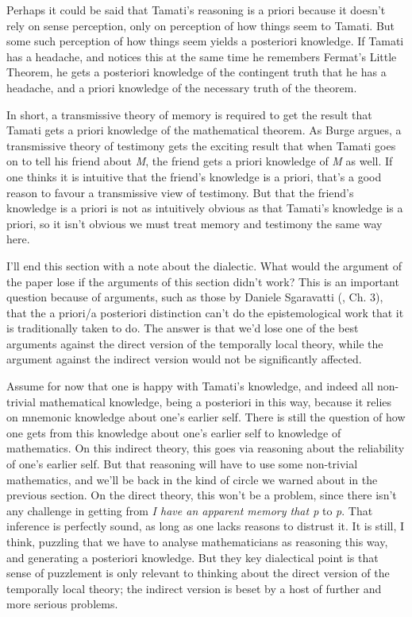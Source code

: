 \documentclass[
  11pt,
  letterpaper,
  DIV=11,
  numbers=noendperiod,
  twoside]{scrartcl}
\begin{document}
Perhaps it could be said that Tamati's reasoning is a priori because it
doesn't rely on sense perception, only on perception of how things seem
to Tamati. But some such perception of how things seem yields a
posteriori knowledge. If Tamati has a headache, and notices this at the
same time he remembers Fermat's Little Theorem, he gets a posteriori
knowledge of the contingent truth that he has a headache, and a priori
knowledge of the necessary truth of the theorem.

In short, a transmissive theory of memory is required to get the result
that Tamati gets a priori knowledge of the mathematical theorem. As
Burge argues, a transmissive theory of testimony gets the exciting
result that when Tamati goes on to tell his friend about \emph{M}, the
friend gets a priori knowledge of \emph{M} as well. If one thinks it is
intuitive that the friend's knowledge is a priori, that's a good reason
to favour a transmissive view of testimony. But that the friend's
knowledge is a priori is not as intuitively obvious as that Tamati's
knowledge is a priori, so it isn't obvious we must treat memory and
testimony the same way here.

I'll end this section with a note about the dialectic. What would the
argument of the paper lose if the arguments of this section didn't work?
This is an important question because of arguments, such as those by
Daniele Sgaravatti (, Ch. 3), that
the a priori/a posteriori distinction can't do the epistemological work
that it is traditionally taken to do. The answer is that we'd lose one
of the best arguments against the direct version of the temporally local
theory, while the argument against the indirect version would not be
significantly affected.

Assume for now that one is happy with Tamati's knowledge, and indeed all
non-trivial mathematical knowledge, being a posteriori in this way,
because it relies on mnemonic knowledge about one's earlier self. There
is still the question of how one gets from this knowledge about one's
earlier self to knowledge of mathematics. On this indirect theory, this
goes via reasoning about the reliability of one's earlier self. But that
reasoning will have to use some non-trivial mathematics, and we'll be
back in the kind of circle we warned about in the previous section. On
the direct theory, this won't be a problem, since there isn't any
challenge in getting from \emph{I have an apparent memory that p} to
\emph{p}. That inference is perfectly sound, as long as one lacks
reasons to distrust it. It is still, I think, puzzling that we have to
analyse mathematicians as reasoning this way, and generating a
posteriori knowledge. But they key dialectical point is that sense of
puzzlement is only relevant to thinking about the direct version of the
temporally local theory; the indirect version is beset by a host of
further and more serious problems.
\end{document}
